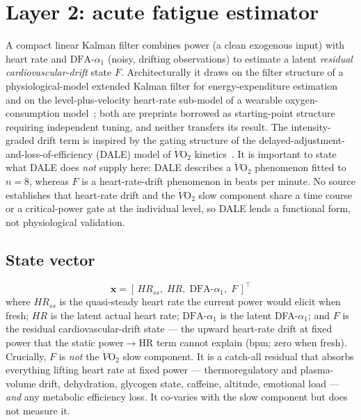 \documentclass[11pt]{article}
\newcommand{\aone}{\ensuremath{\text{DFA-}\alpha_1}}
\newcommand{\Fstate}{\ensuremath{F}}
\begin{document}
\section{Layer 2: acute fatigue estimator}\label{sec:layer2}

A compact linear Kalman filter combines power (a clean exogenous input) with heart rate and $\aone$ (noisy, drifting observations) to estimate a latent \emph{residual cardiovascular-drift} state $\Fstate$. Architecturally it draws on the filter structure of a physiological-model extended Kalman filter for energy-expenditure estimation~\cite{pmekf} and on the level-plus-velocity heart-rate sub-model of a wearable oxygen-consumption model~\cite{labwrist}; both are preprints borrowed as starting-point structure requiring independent tuning, and neither transfers its result. The intensity-graded drift term is inspired by the gating structure of the delayed-adjustment-and-loss-of-efficiency (DALE) model of $\dot{V}\mathrm{O_2}$ kinetics~\cite{gloersen}. It is important to state what DALE does \emph{not} supply here: DALE describes a $\dot{V}\mathrm{O_2}$ phenomenon fitted to $n=8$, whereas $\Fstate$ is a heart-rate-drift phenomenon in beats per minute. No source establishes that heart-rate drift and the $\dot{V}\mathrm{O_2}$ slow component share a time course or a critical-power gate at the individual level, so DALE lends a functional form, not physiological validation.

\subsection{State vector}\label{sec:state}
\begin{equation}
\mathbf{x} = [\,HR_{ss},\; HR,\; \aone,\; \Fstate\,]^{\!\top}
\label{eq:state}
\end{equation}
where $HR_{ss}$ is the quasi-steady heart rate the current power would elicit when fresh; $HR$ is the latent actual heart rate; $\aone$ is the latent DFA-$\alpha_1$; and $\Fstate$ is the residual cardiovascular-drift state --- the upward heart-rate drift at fixed power that the static power$\rightarrow$HR term cannot explain (bpm; zero when fresh). Crucially, $\Fstate$ is \emph{not} the $\dot{V}\mathrm{O_2}$ slow component. It is a catch-all residual that absorbs everything lifting heart rate at fixed power --- thermoregulatory and plasma-volume drift, dehydration, glycogen state, caffeine, altitude, emotional load --- \emph{and} any metabolic efficiency loss. It co-varies with the slow component but does not measure it.
\end{document}
